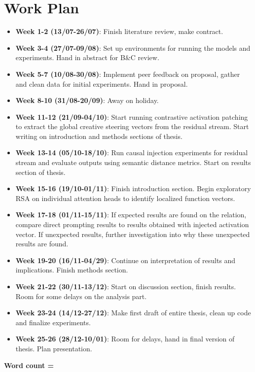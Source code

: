 \documentclass{article}
\begin{document}
\section{Work Plan}
\countem
\begin{itemize}
    \item \textbf{Week 1-2 (13/07-26/07)}: Finish literature review, make contract.
    \item \textbf{Week 3-4 (27/07-09/08)}: Set up environments for running the models and experiments. Hand in abstract for B\&C review.
    \item \textbf{Week 5-7 (10/08-30/08)}: Implement peer feedback on proposal, gather and clean data for initial experiments. Hand in proposal.
    \item \textbf{Week 8-10 (31/08-20/09)}: Away on holiday.
    \item \textbf{Week 11-12 (21/09-04/10)}: Start running contrastive activation patching to extract the global creative steering vectors from the residual stream. Start writing on introduction and methods sections of thesis.
    \item \textbf{Week 13-14 (05/10-18/10)}: Run causal injection experiments for residual stream and evaluate outputs using semantic distance metrics. Start on results section of thesis.
    \item \textbf{Week 15-16 (19/10-01/11)}: Finish introduction section. Begin exploratory RSA on individual attention heads to identify localized function vectors.
    \item \textbf{Week 17-18 (01/11-15/11)}: If expected results are found on the relation, compare direct prompting results to results obtained with injected activation vector. If unexpected results, further investigation into why these unexpected results are found.
    \item \textbf{Week 19-20 (16/11-04/29)}: Continue on interpretation of results and implications. Finish methods section.
    \item \textbf{Week 21-22 (30/11-13/12)}: Start on discussion section, finish results. Room for some delays on the analysis part.
    \item \textbf{Week 23-24 (14/12-27/12)}: Make first draft of entire thesis, clean up code and finalize experiments.
    \item \textbf{Week 25-26 (28/12-10/01)}: Room for delays, hand in final version of thesis. Plan presentation.
\end{itemize}
\endcountem
\textbf{Word count = \thewordcount{}}
\end{document}
